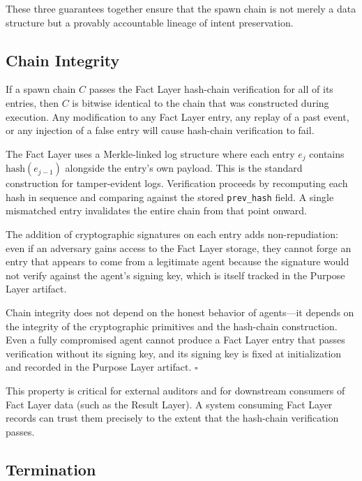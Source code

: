 These three guarantees together ensure that the spawn chain is not merely a data structure but a provably accountable lineage of intent preservation.

\subsection{Chain Integrity}

\begin{prop}\label{prop:chain_integrity}
If a spawn chain $C$ passes the Fact Layer hash-chain verification for all of its entries, then $C$ is bitwise identical to the chain that was constructed during execution. Any modification to any Fact Layer entry, any replay of a past event, or any injection of a false entry will cause hash-chain verification to fail.
\end{prop}

\begin{Proof}[Sketch]
The Fact Layer uses a Merkle-linked log structure where each entry $e_j$ contains $\text{hash}(e_{j-1})$ alongside the entry's own payload. This is the standard construction for tamper-evident logs. Verification proceeds by recomputing each hash in sequence and comparing against the stored \texttt{prev\_hash} field. A single mismatched entry invalidates the entire chain from that point onward.

The addition of cryptographic signatures on each entry adds non-repudiation: even if an adversary gains access to the Fact Layer storage, they cannot forge an entry that appears to come from a legitimate agent because the signature would not verify against the agent's signing key, which is itself tracked in the Purpose Layer artifact.

Chain integrity does not depend on the honest behavior of agents—it depends on the integrity of the cryptographic primitives and the hash-chain construction. Even a fully compromised agent cannot produce a Fact Layer entry that passes verification without its signing key, and its signing key is fixed at initialization and recorded in the Purpose Layer artifact. $\square$
\end{Proof}

This property is critical for external auditors and for downstream consumers of Fact Layer data (such as the Result Layer). A system consuming Fact Layer records can trust them precisely to the extent that the hash-chain verification passes.

\subsection{Termination}

